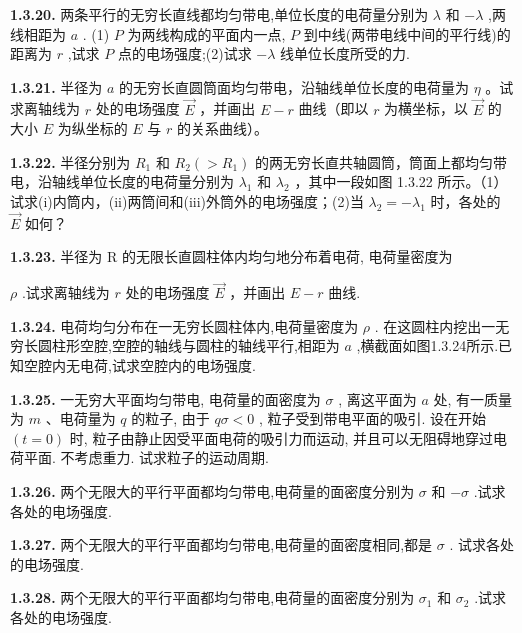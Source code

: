 \vfill

\newpage
\textbf{1.3.20.} 两条平行的无穷长直线都均匀带电,单位长度的电荷量分别为 $\lambda$ 和 $-\lambda$ ,两线相距为 $a$ . (1) $P$ 为两线构成的平面内一点, $P$ 到中线(两带电线中间的平行线)的距离为 $r$ ,试求 $P$ 点的电场强度;(2)试求 $-\lambda$ 线单位长度所受的力.

\vfill

\textbf{1.3.21.} 半径为 $a$ 的无穷长直圆筒面均匀带电，沿轴线单位长度的电荷量为 $\eta$ 。试求离轴线为 $r$ 处的电场强度 $\vec{E}$ ，并画出 $E - r$ 曲线（即以 $r$ 为横坐标，以 $\vec{E}$ 的大小 $E$ 为纵坐标的 $E$ 与 $r$ 的关系曲线）。

\vfill

\newpage
\textbf{1.3.22.} 半径分别为 $R_{1}$ 和 $R_{2}(>R_{1})$ 的两无穷长直共轴圆筒，筒面上都均匀带电，沿轴线单位长度的电荷量分别为 $\lambda_{1}$ 和 $\lambda_{2}$ ，其中一段如图 1.3.22 所示。（1）试求(i)内筒内，(ii)两筒间和(iii)外筒外的电场强度；(2)当 $\lambda_{2} = -\lambda_{1}$ 时，各处的 $\vec{E}$ 如何？

\vfill

\textbf{1.3.23.} 半径为 R 的无限长直圆柱体内均匀地分布着电荷, 电荷量密度为

$\rho$ .试求离轴线为 $r$ 处的电场强度 $\vec{E}$ ，并画出 $E - r$ 曲线.

\vfill

\newpage
\textbf{1.3.24.} 电荷均匀分布在一无穷长圆柱体内,电荷量密度为 $\rho$ . 在这圆柱内挖出一无穷长圆柱形空腔,空腔的轴线与圆柱的轴线平行,相距为 $a$ ,横截面如图1.3.24所示.已知空腔内无电荷,试求空腔内的电场强度.

\vfill

\textbf{1.3.25.} 一无穷大平面均匀带电, 电荷量的面密度为 $\sigma$ , 离这平面为 $a$ 处, 有一质量为 $m$ 、电荷量为 $q$ 的粒子, 由于 $q\sigma < 0$ , 粒子受到带电平面的吸引. 设在开始 $(t = 0)$ 时, 粒子由静止因受平面电荷的吸引力而运动, 并且可以无阻碍地穿过电荷平面. 不考虑重力. 试求粒子的运动周期.

\vfill

\newpage
\textbf{1.3.26.} 两个无限大的平行平面都均匀带电,电荷量的面密度分别为 $\sigma$ 和 $-\sigma$ .试求各处的电场强度.

\vfill

\textbf{1.3.27.} 两个无限大的平行平面都均匀带电,电荷量的面密度相同,都是 $\sigma$ . 试求各处的电场强度.

\vfill

\newpage
\textbf{1.3.28.} 两个无限大的平行平面都均匀带电,电荷量的面密度分别为 $\sigma_{1}$ 和 $\sigma_{2}$ .试求各处的电场强度.

